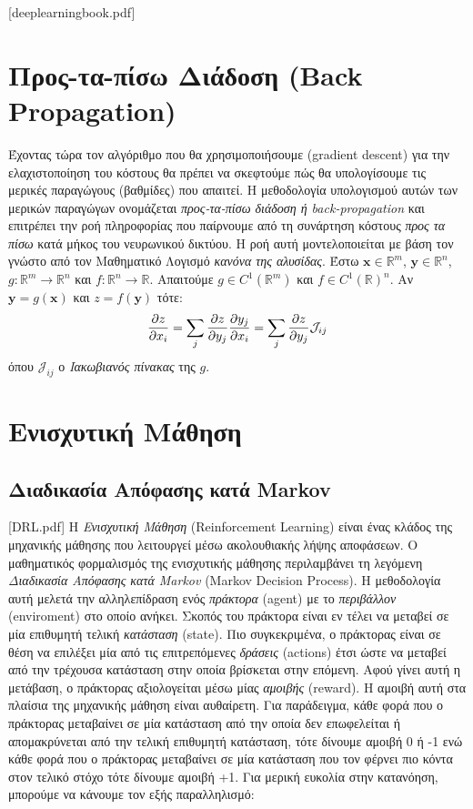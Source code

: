 \documentclass[11pt]{article} %
\numberwithin{equation}{subsection}
\begin{document}
[deeplearningbook.pdf]
\section{Προς-τα-πίσω Διάδοση (Back Propagation)}

Έχοντας τώρα τον αλγόριθμο που θα χρησιμοποιήσουμε (gradient descent) για την ελαχιστοποίηση του κόστους θα πρέπει να σκεφτούμε πώς θα υπολογίσουμε τις μερικές παραγώγους (βαθμίδες) που απαιτεί. Η μεθοδολογία υπολογισμού αυτών των μερικών παραγώγων ονομάζεται \textit{προς-τα-πίσω διάδοση ή back-propagation} και επιτρέπει την ροή πληροφορίας που παίρνουμε από τη συνάρτηση κόστους \textit{προς τα πίσω} κατά μήκος του νευρωνικού δικτύου. Η ροή αυτή μοντελοποιείται με βάση τον γνώστο από τον Μαθηματικό Λογισμό \textit{κανόνα της αλυσίδας}. Έστω $\textbf{x} \in \mathbb{R}^m$, $\textbf{y} \in \mathbb{R}^n$, $g : \mathbb{R}^m \rightarrow \mathbb{R}^n$ και $f : \mathbb{R}^n \rightarrow \mathbb{R}$. Απαιτούμε $g \in C^1 (\mathbb{R}^m)$ και $f \in C^1 (\mathbb{R})^n$. Αν $\textbf{y} = g(\textbf{x})$ και $z = f(\textbf{y})$ τότε:
\begin{align*}
\displaystyle \pdv{z}{x_i} = \sum_{j} \pdv{z}{y_j} \pdv{y_j}{x_i} =  \sum_{j} \pdv{z}{y_j} \mathcal{J}_{ij}
\end{align*}
όπου $\mathcal{J}_{ij}$ ο \textit{Ιακωβιανός πίνακας} της $g$.




\section{Ενισχυτική Μάθηση}
\subsection{Διαδικασία Απόφασης κατά Markov}

[DRL.pdf] Η \textit{Ενισχυτική Μάθηση} (Reinforcement Learning) είναι ένας κλάδος της μηχανικής μάθησης που λειτουργεί μέσω ακολουθιακής λήψης αποφάσεων. Ο μαθηματικός φορμαλισμός της ενισχυτικής μάθησης περιλαμβάνει τη λεγόμενη \textit{Διαδικασία Απόφασης κατά Markov} (Markov Decision Process). Η μεθοδολογία αυτή μελετά την αλληλεπίδραση ενός \textit{πράκτορα} (agent) με το \textit{περιβάλλον} (enviroment) στο οποίο ανήκει. Σκοπός του πράκτορα είναι εν τέλει να μεταβεί σε μία επιθυμητή τελική \textit{κατάσταση} (state). Πιο συγκεκριμένα, ο πράκτορας είναι σε θέση να επιλέξει μία από τις επιτρεπόμενες \textit{δράσεις} (actions) έτσι ώστε να μεταβεί από την τρέχουσα κατάσταση στην οποία βρίσκεται στην επόμενη. Αφού γίνει αυτή η μετάβαση, ο πράκτορας αξιολογείται μέσω μίας \textit{αμοιβής} (reward). Η αμοιβή αυτή στα πλαίσια της μηχανικής μάθηση είναι αυθαίρετη. Για παράδειγμα, κάθε φορά που ο πράκτορας μεταβαίνει σε μία κατάσταση από την οποία δεν επωφελείται ή απομακρύνεται από την τελική επιθυμητή κατάσταση, τότε δίνουμε αμοιβή 0 ή -1 ενώ κάθε φορά που ο πράκτορας μεταβαίνει σε μία κατάσταση που τον φέρνει πιο κόντα στον τελικό στόχο τότε δίνουμε αμοιβή +1. Για μερική ευκολία στην κατανόηση, μπορούμε να κάνουμε τον εξής παραλληλισμό: \\
\end{document}
